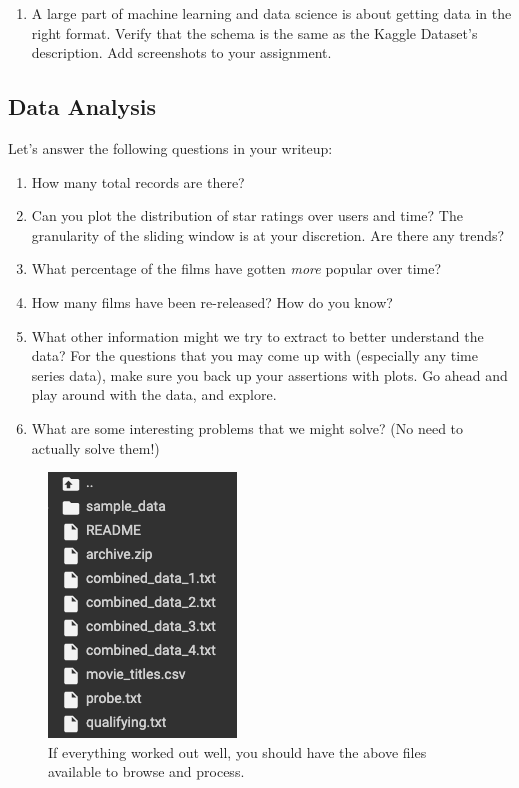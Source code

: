 \documentclass[paper=a4, fontsize=11pt]{scrartcl} %
\begin{document}
\noindent
\begin{enumerate}
\item A large part of machine learning and data science is about getting data in the right format. Verify that the schema is the same as the Kaggle Dataset's description. Add screenshots to your assignment.
\end{enumerate}


\subsection{Data Analysis}
\label{sec:data-analysis}

Let's answer the following questions in your writeup: 

\begin{enumerate}
    \item How many total records are there?
    \item Can you plot the distribution of star ratings over users and time? The granularity of the sliding window is at your discretion. Are there any trends?
    \item What percentage of the films have gotten \emph{more} popular over time?
    \item How many films have been re-released? How do you know?
    \item What other information might we try to extract to better understand the data? For the questions that you may come up with (especially any time series data), make sure you back up your assertions with plots. Go ahead and play around with the data, and explore. 
    \item What are some interesting problems that we might solve? (No need to actually solve them!)
\end{enumerate}

\begin{figure}
    \centering
    \includegraphics{images/hw1q2.png}
    \caption{If everything worked out well, you should have the above files available to browse and process.}
    \label{fig:data-files}
\end{figure}
\end{document}
